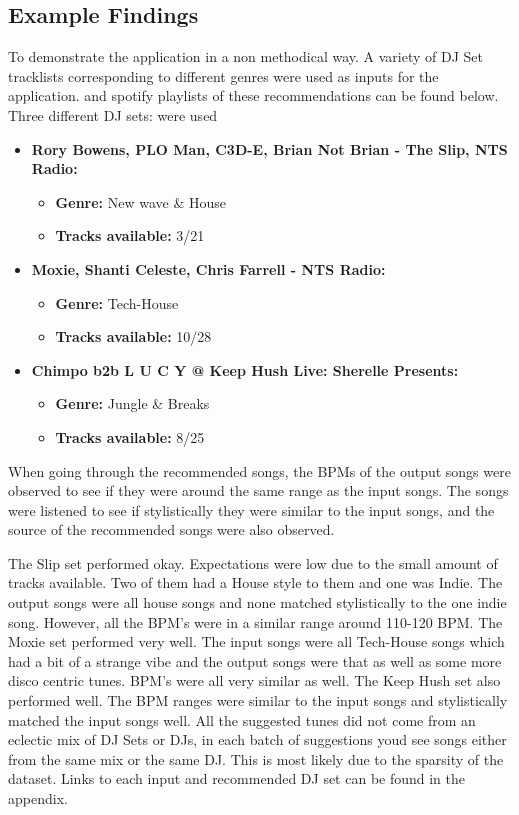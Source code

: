 \subsection{Example Findings}
To demonstrate the application in a non methodical way. A variety of DJ Set tracklists corresponding to different genres were used as inputs for the application. and spotify playlists of these recommendations can be found below.  Three different DJ sets: were used

\begin{itemize}
	\item \textbf{Rory Bowens, PLO Man, C3D-E, Brian Not Brian - The Slip, NTS Radio: } 
	\begin{itemize}
		\item \textbf{Genre:} New wave \& House
		\item \textbf{Tracks available:} 3/21
	\end{itemize}
	\item \textbf{Moxie, Shanti Celeste, Chris Farrell - NTS Radio: } 
	\begin{itemize}
		\item \textbf{Genre:} Tech-House
	\item \textbf{Tracks available:} 10/28
	\end{itemize}
	\item \textbf{Chimpo b2b L U C Y @ Keep Hush Live: Sherelle Presents:}
	\begin{itemize}
		\item \textbf{Genre:} Jungle \& Breaks
	\item \textbf{Tracks available:} 8/25
	\end{itemize}
	
\end{itemize}

When going through the recommended songs, the BPMs of the output songs were observed to see if they were around the same range as the input songs. The songs were listened to see if stylistically they were similar to the input songs, and the source of the recommended songs were also observed.

The Slip set performed okay. Expectations were low due to the small amount of tracks available. Two of them had a House style to them and one was Indie. The output songs were all house songs and none matched stylistically to the one indie song. However, all the BPM's were in a similar range around 110-120 BPM. The Moxie set performed very well. The input songs were all Tech-House songs which had a bit of a strange vibe and the output songs were that as well as some more disco centric tunes. BPM's were all very similar as well. The Keep Hush set also performed well. The BPM ranges were similar to the input songs and stylistically matched the input songs well. All the suggested tunes did not come from an eclectic mix of DJ Sets or DJs, in each batch of suggestions youd see songs either from the same mix or the same DJ. This is most likely due to the sparsity of the dataset. Links to each input and recommended DJ set can be found in the appendix.

